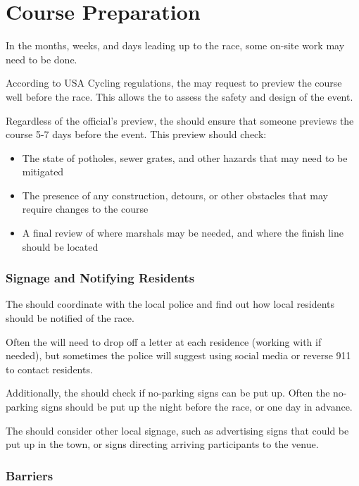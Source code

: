\section{Course Preparation}

In the months, weeks, and days leading up to the race, some on-site work may need to be done.

According to USA Cycling regulations, the  may request to preview the course well before the race.
This allows the  to assess the safety and design of the event.

Regardless of the official's preview, the  should ensure that someone previews the course 5-7 days before the event.
This preview should check:
\begin{itemize}
  \item The state of potholes, sewer grates, and other hazards that may need to be mitigated
  \item The presence of any construction, detours, or other obstacles that may require changes to the course
  \item A final review of where marshals may be needed, and where the finish line should be located
\end{itemize}

\subsubsection{Signage and Notifying Residents}

The  should coordinate with the local police and find out how local residents should be notified of the race.

Often the  will need to drop off a letter at each residence (working with  if needed),
but sometimes the police will suggest using social media or reverse 911 to contact residents.

Additionally, the  should check if no-parking signs can be put up.
Often the no-parking signs should be put up the night before the race, or one day in advance.


The  should consider other local signage, such as advertising signs that could be put up in the town,
or signs directing arriving participants to the venue.

\subsubsection{Barriers}

